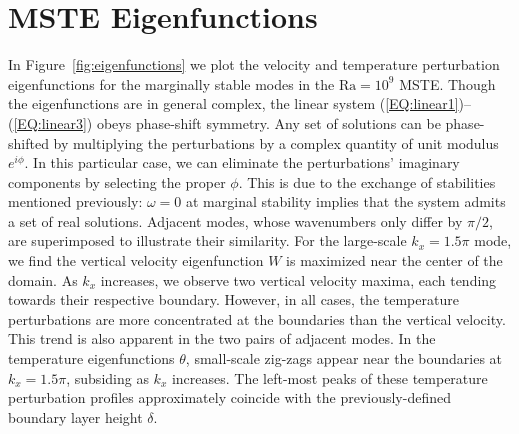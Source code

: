 \documentclass[reprint,amsmath,amssymb,aps,nofootinbib]{revtex4-1}
\newcommand\Ra{\mathrm{Ra}}
\newcommand{\eqss}[2]{(\ref{#1})--(\ref{#2})}
\begin{document}
\section{MSTE Eigenfunctions}\label{sec:eigenfunctions}

In Figure~\ref{fig:eigenfunctions} we plot the velocity and temperature perturbation eigenfunctions for the marginally stable modes in the $\Ra =10^9$ MSTE.
Though the eigenfunctions are in general complex, the linear system \eqss{EQ:linear1}{EQ:linear3} obeys phase-shift symmetry.
Any set of solutions can be phase-shifted by multiplying the perturbations by a complex quantity of unit modulus $e^{i\phi}$.
In this particular case, we can eliminate the perturbations' imaginary components by selecting the proper $\phi$.
This is due to the exchange of stabilities mentioned previously: $\omega = 0$ at marginal stability implies that the system admits a set of real solutions.
Adjacent modes, whose wavenumbers only differ by $\pi/2$, are superimposed to illustrate their similarity.
For the large-scale $k_x = 1.5\pi$ mode, we find the vertical velocity eigenfunction $W$ is maximized near the center of the domain.
As $k_x$ increases, we observe two vertical velocity maxima, each tending towards their respective boundary.
However, in all cases, the temperature perturbations are more concentrated at the boundaries than the vertical velocity.
This trend is also apparent in the two pairs of adjacent modes.
In the temperature eigenfunctions $\theta$, small-scale zig-zags appear near the boundaries at $k_x = 1.5\pi$, subsiding as $k_x$ increases.
The left-most peaks of these temperature perturbation profiles approximately coincide with the previously-defined boundary layer height $\delta$.
\end{document}
